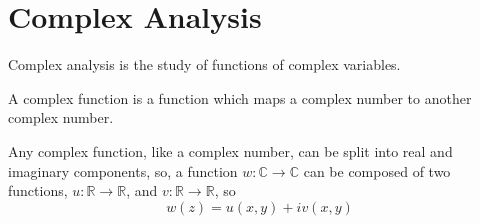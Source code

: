 %
\section{Complex Analysis}
\label{sec:complex}

Complex analysis is the study of functions of complex variables.

\begin{definition}
  A complex function is a function which maps a complex number to
  another complex number.
\end{definition}
Any complex function, like a complex number, can be split into real
and imaginary components, so, a function $w: \mathbb{C} \to
\mathbb{C}$ can be composed of two functions, $u: \mathbb{R} \to
\mathbb{R}$, and $v: \mathbb{R} \to \mathbb{R}$, so
\[ w(z) = u(x,y) + i v(x,y) \]

